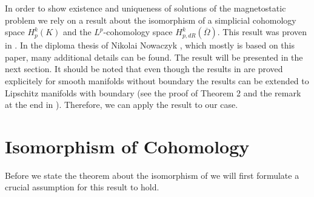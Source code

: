 \documentclass[12pt,a4paper]{article}
\theoremstyle{definition}
\newcommand{\omegabar}{\overline{\Omega}}
\newcommand{\real}{\mathbb{R}}
\begin{document}
In order to show existence and uniqueness of solutions of the magnetostatic 
problem we rely on a result about the isomorphism of a simplicial 
cohomology space $H^k_p(K)$ and the $L^p$-cohomology space 
$H^k_{p,dR}(\omegabar)$.
This result was proven in \cite{goldshtein}. In the diploma thesis of Nikolai
Nowaczyk \cite{nowaczyk}, which mostly is based on this paper, 
many additional details can be found. The result will be presented in the
next section. It should be noted that even though the results in 
\cite{goldshtein} are
proved explicitely for smooth manifolds without boundary the results can be 
extended to Lipschitz manifolds with boundary (see the proof of Theorem 2 and 
the remark at the end in \cite{goldshtein}). Therefore, we can apply the result
to our case.










\section{Isomorphism of Cohomology}

Before we state the theorem about the isomorphism of we will first formulate 
a crucial assumption for this result to hold.
\end{document}
